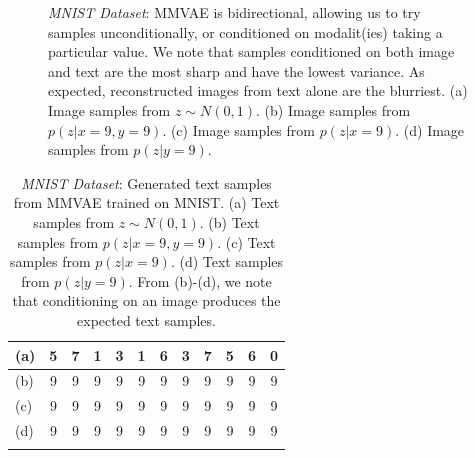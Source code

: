 \documentclass{article}
\begin{document}
\begin{figure}[!h]
\begin{subfigure}[b]{.24\linewidth}
        \caption{}
    \end{subfigure}
    \caption{\emph{MNIST Dataset}: MMVAE is bidirectional, allowing us to try samples unconditionally, or conditioned on modalit(ies) taking a particular value. We note that samples conditioned on both image and text are the most sharp and have the lowest variance. As expected, reconstructed images from text alone are the blurriest. (a) Image samples from $z \sim N(0, 1)$. (b) Image samples from $p(z|x=9,y=9)$. (c) Image samples from $p(z|x=9)$. (d) Image samples from $p(z|y=9)$.}
    \label{fig:mnist:samples}
\end{figure}

\begin{table}[!h]
    \centering
    \begin{tabular}{ l | c | c | c | c | c | c | c | c | c | c | c}
        (a) & 5 & 7 & 1 & 3 & 1 & 6 & 3 & 7 & 5 & 6 & 0 \\
        \hline
        (b) & 9 & 9 & 9 & 9 & 9 & 9 & 9 & 9 & 9 & 9 & 9 \\
        \hline
        (c) & 9 & 9 & 9 & 9 & 9 & 9 & 9 & 9 & 9 & 9 & 9 \\
        \hline
        (d) & 9 & 9 & 9 & 9 & 9 & 9 & 9 & 9 & 9 & 9 & 9 \\
        \newline
    \end{tabular}
    \caption{\emph{MNIST Dataset}: Generated text samples from MMVAE trained on MNIST. (a) Text samples from $z \sim N(0, 1)$. (b) Text samples from $p(z|x=9,y=9)$. (c) Text samples from $p(z|x=9)$. (d) Text samples from $p(z|y=9)$. From (b)-(d), we note that conditioning on an image produces the expected text samples.}
    \label{table:mnist:samples}
\end{table}
\end{document}
